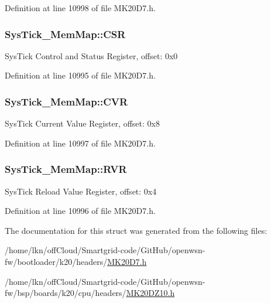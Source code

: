 Definition at line 10998 of file M\+K20\+D7.\+h.

\subsubsection[{\texorpdfstring{C\+SR}{CSR}}]{ Sys\+Tick\+\_\+\+Mem\+Map\+::\+C\+SR}\hypertarget{struct_sys_tick___mem_map_aec23689880afd46876916055403e867a}{}\label{struct_sys_tick___mem_map_aec23689880afd46876916055403e867a}
Sys\+Tick Control and Status Register, offset\+: 0x0 

Definition at line 10995 of file M\+K20\+D7.\+h.

\subsubsection[{\texorpdfstring{C\+VR}{CVR}}]{ Sys\+Tick\+\_\+\+Mem\+Map\+::\+C\+VR}\hypertarget{struct_sys_tick___mem_map_a508dd628bc347f199e7baf4b1bfbfa0d}{}\label{struct_sys_tick___mem_map_a508dd628bc347f199e7baf4b1bfbfa0d}
Sys\+Tick Current Value Register, offset\+: 0x8 

Definition at line 10997 of file M\+K20\+D7.\+h.

\subsubsection[{\texorpdfstring{R\+VR}{RVR}}]{ Sys\+Tick\+\_\+\+Mem\+Map\+::\+R\+VR}\hypertarget{struct_sys_tick___mem_map_a3f2018b492fd4bc1d141a718d499e50f}{}\label{struct_sys_tick___mem_map_a3f2018b492fd4bc1d141a718d499e50f}
Sys\+Tick Reload Value Register, offset\+: 0x4 

Definition at line 10996 of file M\+K20\+D7.\+h.



The documentation for this struct was generated from the following files\+:\begin{DoxyCompactItemize}
\item 
/home/lkn/off\+Cloud/\+Smartgrid-\/code/\+Git\+Hub/openwsn-\/fw/bootloader/k20/headers/\hyperlink{bootloader_2k20_2headers_2_m_k20_d7_8h}{M\+K20\+D7.\+h}\item 
/home/lkn/off\+Cloud/\+Smartgrid-\/code/\+Git\+Hub/openwsn-\/fw/bsp/boards/k20/cpu/headers/\hyperlink{_m_k20_d_z10_8h}{M\+K20\+D\+Z10.\+h}\end{DoxyCompactItemize}

